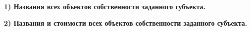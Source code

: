 \documentclass[12pt, a4paper]{extarticle}
\begin{document}
\textbf{1) Названия всех объектов собственности заданного субъекта.}\par
\begin{figure}[h!]	
\end{figure}\par

\begin{figure}[h!]	
\end{figure}\par

\begin{figure}[h!]	
\end{figure}\par

\textbf{2) Названия и стоимости всех объектов собственности заданного субъекта.}\par

\begin{figure}[h!]	
\end{figure}\par

\begin{figure}[h!]	
\end{figure}\par
\end{document}
